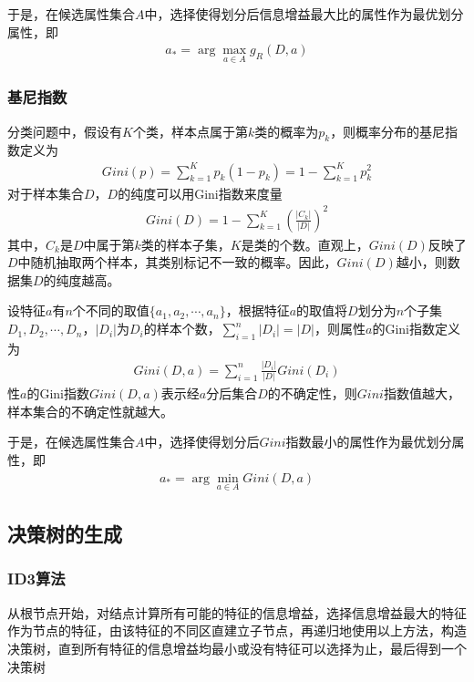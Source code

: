 于是，在候选属性集合$A$中，选择使得划分后信息增益最大比的属性作为最优划分属性，即
\begin{eqnarray}
a_*=\arg\max_{a\in A}g_R(D,a)
\end{eqnarray}

\subsubsection{基尼指数}
分类问题中，假设有$K$个类，样本点属于第$k$类的概率为$p_k$，则概率分布的基尼指数定义为
\begin{eqnarray}
Gini(p)=\sum_{k=1}^K p_k(1-p_k)=1-\sum_{k=1}^K p_k^2
\end{eqnarray}
对于样本集合$D$，$D$的纯度可以用Gini指数来度量
\begin{eqnarray}
Gini(D)=1-\sum_{k=1}^K \left( \frac{|C_k|}{|D|} \right)^2
\end{eqnarray}
其中，$C_k$是$D$中属于第$k$类的样本子集，$K$是类的个数。直观上，$Gini(D)$反映了$D$中随机抽取两个样本，其类别标记不一致的概率。因此，$Gini(D)$越小，则数据集$D$的纯度越高。

设特征$a$有$n$个不同的取值$\{ a_1,a_2,\cdots,a_n \}$，根据特征$a$的取值将$D$划分为$n$个子集$D_1,D_2,\cdots,D_n$，$|D_i|$为$D_i$的样本个数，$\sum_{i=1}^n|D_i|=|D|$，则属性$a$的Gini指数定义为
\begin{eqnarray}
Gini(D,a)=\sum_{i=1}^n \frac{|D_i|}{|D|}Gini(D_i)
\end{eqnarray}
性$a$的Gini指数$Gini(D,a)$表示经$a$分后集合$D$的不确定性，则$Gini$指数值越大，样本集合的不确定性就越大。

于是，在候选属性集合$A$中，选择使得划分后$Gini$指数最小的属性作为最优划分属性，即
\begin{eqnarray}
a_*=\arg\min_{a\in A}Gini(D,a)
\end{eqnarray}

\subsection{决策树的生成}
\subsubsection{ID3算法}
从根节点开始，对结点计算所有可能的特征的信息增益，选择信息增益最大的特征作为节点的特征，由该特征的不同区直建立子节点，再递归地使用以上方法，构造决策树，直到所有特征的信息增益均最小或没有特征可以选择为止，最后得到一个决策树
